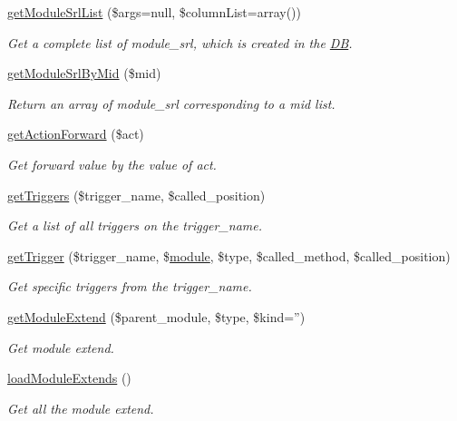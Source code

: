 \begin{DoxyCompactItemize}
\hyperlink{classmoduleModel_ae63e7e551002fac4c01a330a76dd7244}{get\-Module\-Srl\-List} (\$args=null, \$column\-List=array())
\begin{DoxyCompactList}\small\item\em Get a complete list of module\-\_\-srl, which is created in the \hyperlink{classDB}{D\-B}. \end{DoxyCompactList}\item 
\hyperlink{classmoduleModel_a857a241844d60b7678bd144175d23f29}{get\-Module\-Srl\-By\-Mid} (\$mid)
\begin{DoxyCompactList}\small\item\em Return an array of module\-\_\-srl corresponding to a mid list. \end{DoxyCompactList}\item 
\hyperlink{classmoduleModel_a2a06b59fa663c1e79f81aac571e2e5c8}{get\-Action\-Forward} (\$act)
\begin{DoxyCompactList}\small\item\em Get forward value by the value of act. \end{DoxyCompactList}\item 
\hyperlink{classmoduleModel_a979238a3b59bf52ccaa29ec3f7744808}{get\-Triggers} (\$trigger\-\_\-name, \$called\-\_\-position)
\begin{DoxyCompactList}\small\item\em Get a list of all triggers on the trigger\-\_\-name. \end{DoxyCompactList}\item 
\hyperlink{classmoduleModel_ae570716b47c7fd19b7fc0d217a155b22}{get\-Trigger} (\$trigger\-\_\-name, \$\hyperlink{classmodule}{module}, \$type, \$called\-\_\-method, \$called\-\_\-position)
\begin{DoxyCompactList}\small\item\em Get specific triggers from the trigger\-\_\-name. \end{DoxyCompactList}\item 
\hyperlink{classmoduleModel_a1dd3c03b874a4f6e05f6b5e8ec283665}{get\-Module\-Extend} (\$parent\-\_\-module, \$type, \$kind='')
\begin{DoxyCompactList}\small\item\em Get module extend. \end{DoxyCompactList}\item 
\hyperlink{classmoduleModel_adfde81ebf0fcb2814ba49ad23ce803ff}{load\-Module\-Extends} ()
\begin{DoxyCompactList}\small\item\em Get all the module extend. \end{DoxyCompactList}\item 

\end{DoxyCompactItemize}
